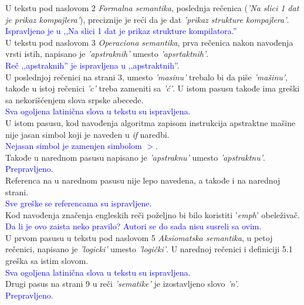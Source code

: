 \documentclass[a4paper]{report}
\newcommand{\odgovor}[1]{\textcolor{blue}{#1}}
\begin{document}
U tekstu pod naslovom 2 \emph{Formalna semantika}, poslednja rečenica (\emph{'Na slici 1 dat je prikaz kompajlera'}), preciznije je reći da je dat \emph{'prikaz strukture kompajlera'}.\\
\odgovor{Ispravljeno je u ,,Na slici 1 dat je prikaz strukture kompilatora.''}\\

U tekstu pod naslovom 3 \emph{Operaciona semantika}, prva rečenica nakon navođenja vrsti istih, napisano je \emph{'apstraknih'} umesto \emph{'apsrtaktnih'}.\\
\odgovor{Reč ,,apstraknih'' je ispravljena u ,,apstraktnih''}.\\
U poslednjoj rečenici na strani 3, umesto \emph{'masinu'} trebalo bi da piše \emph{'mašinu'}, takođe u istoj rečenici \emph{'c'} treba zameniti sa \emph{'ć'}.
 U istom pasusu takođe ima greški sa nekorišćenjem slova srpske abecede.\\
\odgovor{Sva ogoljena latinična slova u tekstu su ispravljena.}\\
 U istom pasusu, kod navođenja algoritma zapisom instrukcija apstraktne mašine nije jasan simbol koji je naveden u \emph{if} naredbi. \\
\odgovor{Nejasan simbol je zamenjen simbolom $>$.}\\
 Takođe u narednom pasusu napisano je \emph{'apstraknu'} umesto \emph{'apstraktnu'}. \\
\odgovor{Prepravljeno.}\\
Referenca na u narednom pasusu nije lepo navedena, a takođe i na narednoj strani.\\
\odgovor{Sve greške se referencama su ispravljene.}\\ 
Kod navođenja značenja engleskih reči poželjno bi bilo koristiti '\emph{emph}' obeleživač.\\
\odgovor{Da li je ovo zaista neko pravilo? Autori se do sada nisu susreli sa ovim.}\\

U prvom pasusu u tekstu pod naslovom 5 \emph{Aksiomatska semantika}, u petoj rečenici, napisano je \emph{'logicki'} umesto \emph{'logički'}.
 U narednoj rečenici i definiciji 5.1 greška sa istim slovom.\\
\odgovor{Sva ogoljena latinična slova u tekstu su ispravljena.}\\
  Drugi pasus na strani 9 u reči \emph{'sematike'} je izostavljeno slovo \emph{'n'}.\\
   \odgovor{Prepravljeno.}\\
\end{document}
